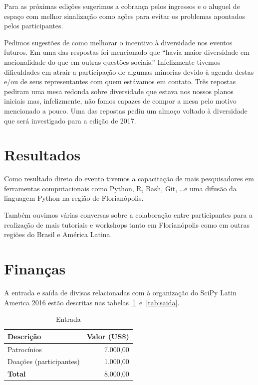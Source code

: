 \documentclass[12pt]{article}
\begin{document}
Para as próximas edições sugerimos a cobrança pelos ingressos e o aluguel de
espaço com melhor sinalização como ações para evitar os problemas apontados
pelos participantes.

Pedimos sugestões de como melhorar o incentivo à diversidade nos eventos
futuros. Em uma das respostas foi mencionado que ``havia maior diversidade em nacionalidade do que em outras
questões sociais.'' Infelizmente tivemos dificuldades em atrair a participação
de algumas minorias devido à agenda destas e/ou de seus representantes com quem
estávamos em contato. Três repostas pediram uma mesa redonda sobre diversidade
que estava nos nossos planos iniciais mas, infelizmente, não fomos capazes de
compor a mesa pelo motivo mencionado a pouco. Uma das repostas pediu um almoço
voltado à diversidade que será investigado para a edição de 2017.

\clearpage
\newpage

\section*{Resultados}

Como resultado direto do evento tivemos a capacitação de mais pesquisadores em
ferramentas computacionais como Python, R, Bash, Git, \ldots e uma difusão da
linguagem Python na região de Florianópolis.

Também ouvimos várias conversas sobre a colaboração entre participantes
para a realização de mais tutoriais e workshops tanto em Florianópolis
como em outras regiões do Brasil e América Latina.

\clearpage
\newpage

\section*{Finanças}

A entrada e saída de divisas relacionadas com à organização do SciPy Latin
America 2016 estão descritas nas tabelas~\ref{tab:entrada}~e~\ref{tab:saida}.

\begin{table}[!htb]
  \center
  \caption{Entrada} \label{tab:entrada}
  \begin{tabular}{m{9cm}@{} @{}r}
     \toprule
     \textbf{Descrição} & \textbf{Valor (US\$)} \\
     \midrule
     Patrocínios & 7.000,00 \\
     Doações (participantes) & 1.000,00 \\
     \midrule
     \textbf{Total} & 8.000,00 \\
     \bottomrule
   \end{tabular}
\end{table}
\end{document}
